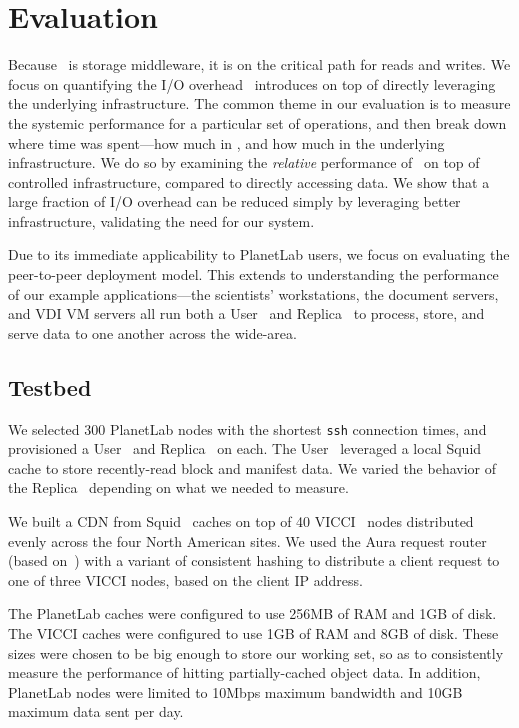 \section{Evaluation}
\label{sec:evaluation}

Because \Syndicate\ is storage middleware,
it is on the critical path for reads and writes.
We focus on quantifying the I/O overhead
\Syndicate\ introduces on top of directly leveraging 
the underlying infrastructure.  The common theme in our evaluation is
to measure the systemic performance 
for a particular set of operations, and then break down
where time was spent---how much in \Syndicate, and
how much in the underlying infrastructure.  We do so by 
examining the {\it relative} performance of \Syndicate\
on top of controlled infrastructure, compared to directly 
accessing data.  We show that a large
fraction of I/O overhead can be reduced simply 
by leveraging better infrastructure, validating the need 
for our system.

Due to its immediate applicability to PlanetLab users,
we focus on evaluating the peer-to-peer deployment model.
This extends to understanding the performance of our example
applications---the scientists' workstations, the document servers, and 
VDI VM servers all run both a User \SGs\ and Replica \SGs\ to 
process, store, and serve data to one another across 
the wide-area.

\subsection{Testbed}

We selected 300 PlanetLab nodes with the shortest {\tt ssh} connection times,
and provisioned a User \SG\ and Replica \SG\ on each.  The User \SG\
leveraged a local Squid~\cite{Squid} cache to store recently-read block and
manifest data.  We varied the 
behavior of the Replica \SG\ depending on what we needed to measure.

We built a CDN from Squid~\cite{Squid} caches on top of
40 VICCI~\cite{VICCI} nodes distributed evenly across the
four North American sites.  We used the Aura request router~\cite{aura-rr}
(based on~\cite{cdn-redirect}) with a variant of consistent hashing
to distribute a client request to one of three VICCI nodes, based
on the client IP address.

The PlanetLab caches were configured to use 256MB of RAM and 1GB of disk.
The VICCI caches were configured to use 1GB of RAM and 8GB of disk.  These sizes 
were chosen to be big enough to store our working set, so as to consistently
measure the performance of hitting partially-cached object data.
In addition, PlanetLab nodes were limited to 10Mbps maximum bandwidth 
and 10GB maximum data sent per day.

